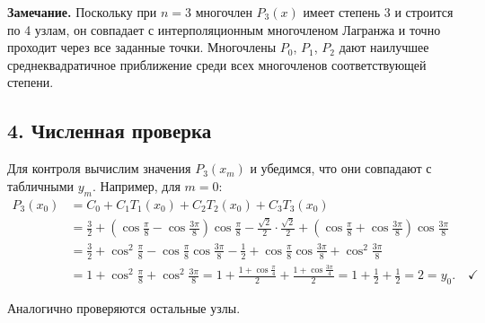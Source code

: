 \documentclass{article}
\begin{document}
\textbf{Замечание.} Поскольку при $n = 3$ многочлен $P_3(x)$ имеет степень 3 и строится по 4 узлам, он совпадает с интерполяционным многочленом Лагранжа и точно проходит через все заданные точки. Многочлены $P_0$, $P_1$, $P_2$ дают наилучшее среднеквадратичное приближение среди всех многочленов соответствующей степени.

\subsection*{4. Численная проверка}

Для контроля вычислим значения $P_3(x_m)$ и убедимся, что они совпадают с табличными $y_m$. Например, для $m = 0$:
\begin{align}
P_3(x_0) &= C_0 + C_1 T_1(x_0) + C_2 T_2(x_0) + C_3 T_3(x_0) \nonumber \\
&= \frac{3}{2} + \left(\cos\frac{\pi}{8} - \cos\frac{3\pi}{8}\right)\cos\frac{\pi}{8} - \frac{\sqrt{2}}{2}\cdot\frac{\sqrt{2}}{2} + \left(\cos\frac{\pi}{8} + \cos\frac{3\pi}{8}\right)\cos\frac{3\pi}{8} \nonumber \\
&= \frac{3}{2} + \cos^2\frac{\pi}{8} - \cos\frac{\pi}{8}\cos\frac{3\pi}{8} - \frac{1}{2} + \cos\frac{\pi}{8}\cos\frac{3\pi}{8} + \cos^2\frac{3\pi}{8} \nonumber \\
&= 1 + \cos^2\frac{\pi}{8} + \cos^2\frac{3\pi}{8} = 1 + \frac{1+\cos\frac{\pi}{4}}{2} + \frac{1+\cos\frac{3\pi}{4}}{2} = 1 + \frac{1}{2} + \frac{1}{2} = 2 = y_0. \quad \checkmark
\end{align}

Аналогично проверяются остальные узлы.
\end{document}
